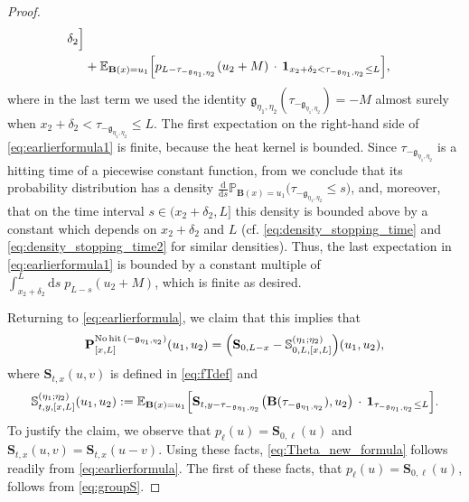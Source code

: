 \documentclass[oneside,final,11pt]{amsart}
\theoremstyle{definition}
\newcommand\nohit{\uptext{No\! hit}}
\newcommand{\fg}{\mathfrak{g}}
\renewcommand{\d}{\mathrm{d}}
\renewcommand{\SS}{\mathbb{S}}
\newcommand{\1}[1]{\mathbf{1}_{#1}}
\newcommand{\E}{\mathbb E}
\newcommand{\uptext}[1]{\text{\upshape{#1}}}
\newcommand{\fT}{\mathbf{S}}
\newcommand{\fx}{x}
\newcommand{\fy}{y}
\newcommand{\fB}{\mathbf{B}}
\newcommand{\fP}{\mathbf{P}}
\renewcommand{\P}{\mathbb P}
\numberwithin{equation}{section}
\begin{document}
\begin{proof}
\begin{align}
{	\delta_2}\Bigr] \label{eq:earlierformula1}\\
	&+ \E_{\fB(\fx)=u_1} \Bigl[p_{L - \tau_{-\fg_{\eta_1, \eta_2}}} (u_2 + M) \,\cdot\, \1{x_2 +
	\delta_2 < \tau_{-\fg_{\eta_1, \eta_2}} \leq L}\Bigr],
\end{align}
where in the last term we used the identity $\fg_{\eta_1, \eta_2}(\tau_{-\fg_{\eta_1, \eta_2}}) = -M$ almost surely when $x_2 + \delta_2 < \tau_{-\fg_{\eta_1, \eta_2}} \leq L$. The first expectation on the right-hand side of \eqref{eq:earlierformula1} is finite, because the heat kernel is bounded. Since $\tau_{-\fg_{\eta_1, \eta_2}}$ is a hitting time of a piecewise constant function, from \cite[Section~2.6]{karatzas1998brownian} we conclude that its probability distribution has a density
$\frac{\d}{\d s} \P_{\fB(x) = u_1} \bigl(\tau_{-\fg_{\eta_1, \eta_2}} \leq s\bigr)$,
and, moreover, that on the time interval $s \in (x_2 + \delta_2, L]$ this density is bounded above by a constant which depends on $x_2 + \delta_2$ and $L$ (cf. \eqref{eq:density_stopping_time} and \eqref{eq:density_stopping_time2} for  similar densities). Thus, the last expectation in \eqref{eq:earlierformula1} is bounded by a constant multiple of
$\int_{x_2 + \delta_2}^L \d s\; p_{L - s} (u_2 + M)$, which is finite as desired.

Returning to \eqref{eq:earlierformula}, we claim that this implies that
\begin{equation}\label{eq:Theta_new_formula}
\fP_{[\fx, L]}^{\nohit\,(-\fg_{\eta_1, \eta_2})}(u_1, u_2) = \Bigl(\fT_{0, L - \fx} - \SS_{0, L, [\fx, L]}^{(\eta_1; \eta_2)}\Bigr) (u_1, u_2),
\end{equation}
where $\fT_{t,x}(u,v)$ is defined in  \eqref{eq:fTdef} and
\begin{equation}\label{eq:S_bold}
\SS_{t, \fy, [\fx, L]}^{(\eta_1; \eta_2)}(u_1, u_2) := \E_{\fB(\fx)=u_1}\Bigl[ \fT_{t, \fy - \tau_{-\fg_{\eta_1, \eta_2}}} \bigl(\fB(\tau_{-\fg_{\eta_1, \eta_2}}), u_2 \bigr) \,\cdot\, \1{\tau_{-\fg_{\eta_1, \eta_2}} \leq L}\Bigr].
\end{equation}
To justify the claim, we observe that $p_\ell(u) = \fT_{0,\ell}(u)$ and $\fT_{t,x}(u,v) = \fT_{t,x}(u - v)$. Using these facts, \eqref{eq:Theta_new_formula} follows readily from \eqref{eq:earlierformula}. The first of these facts, that $p_\ell(u) = \fT_{0,\ell}(u)$, follows from \eqref{eq:groupS}.


\end{proof}
\end{document}
